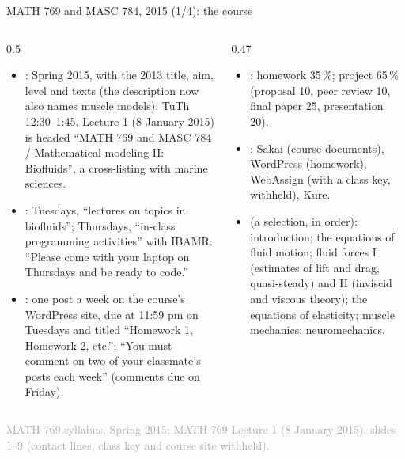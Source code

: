\documentclass[aspectratio=169,11pt]{beamer}
\newcommand{\sourcecredit}[1]{\vfill\begin{flushright}\tiny\textcolor{DarkGray}{#1}\end{flushright}}
\begin{document}
\begin{frame}{MATH 769 and MASC 784, 2015 (1/4): the course}
\label{fr:m769c}
\begin{columns}[T,onlytextwidth]
\begin{column}{0.5\textwidth}
\footnotesize
\begin{itemize}\setlength{\itemsep}{3pt}
  \item {}: Spring 2015, with the 2013 title, aim, level and texts (the description now also names muscle models); TuTh 12:30--1:45. Lecture 1 (8 January 2015) is headed ``MATH 769 and MASC 784 / Mathematical modeling II: Biofluids'', a cross-listing with marine sciences.
  \item {}: Tuesdays, ``lectures on topics in biofluids''; Thursdays, ``in-class programming activities'' with IBAMR: ``Please come with your laptop on Thursdays and be ready to code.''
  \item {}: one post a week on the course's WordPress site, due at 11:59 pm on Tuesdays and titled ``Homework 1, Homework 2, etc.''; ``You must comment on two of your classmate's posts each week'' (comments due on Friday).
\end{itemize}
\end{column}
\begin{column}{0.47\textwidth}
\footnotesize
\begin{itemize}\setlength{\itemsep}{3pt}
  \item {}: homework 35\,\%; project 65\,\% (proposal 10, peer review 10, final paper 25, presentation 20).
  \item {}: Sakai (course documents), WordPress (homework), WebAssign (with a class key, withheld), Kure.
  \item {} (a selection, in order): introduction; the equations of fluid motion; fluid forces I (estimates of lift and drag, quasi-steady) and II (inviscid and viscous theory); the equations of elasticity; muscle mechanics; neuromechanics.
\end{itemize}
\end{column}
\end{columns}
\sourcecredit{MATH 769 syllabus, Spring 2015; MATH 769 Lecture 1 (8 January 2015), slides 1--9 (contact lines, class key and course site withheld).}
\end{frame}
\end{document}
